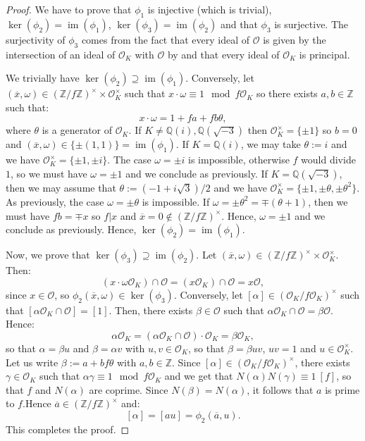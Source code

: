 \documentclass[a4paper,10pt]{report}
\theoremstyle{definition}
\theoremstyle{plain}
\theoremstyle{definition}
\newcommand{\Z}{\mathbb{Z}}
\newcommand{\Q}{\mathbb{Q}}
\newcommand{\mO}{\mathcal{O}}
\DeclareMathOperator{\im}{im}
\renewcommand{\(}{\left(}
\renewcommand{\)}{\right)}
\begin{document}
\begin{proof}
We have to prove that $\phi_1$ is injective (which is trivial), $\ker(\phi_2)=\im(\phi_1)$, $\ker(\phi_3)=\im(\phi_2)$ and that $\phi_3$ is surjective. The surjectivity of $\phi_3$ comes from the fact that every ideal of $\mO$ is given by the intersection of an ideal of $\mO_K$ with $\mO$ by \cite[Proposition 7.20]{Cox} and that every ideal of $\mO_K$ is principal.

We trivially have $\ker(\phi_2)\supseteq \im(\phi_1)$. Conversely, let $(\overline{x},\omega)\in (\Z/f\Z)^\times\times \mO_K^\times$ such that $x\cdot \omega\equiv 1 \mod f\mO_K$ so there exists $a, b\in\Z$ such that:
\[x\cdot\omega=1+fa+fb\theta,\]
where $\theta$ is a generator of $\mO_K$. If $K\neq\Q(i),\Q(\sqrt{-3})$ then $\mO_K^\times=\{\pm 1\}$ so $b=0$ and $(\overline{x},\omega)\in\{\pm(1,1)\}=\im(\phi_1)$. If $K=\Q(i)$, we may take $\theta:=i$ and we have $\mO_K^\times=\{\pm 1, \pm i\}$. The case $\omega=\pm i$ is impossible, otherwise $f$ would divide $1$, so we must have $\omega=\pm 1$ and we conclude as previously. If $K=\Q(\sqrt{-3})$, then we may assume that $\theta:=(-1+i\sqrt{3})/2$ and we have $\mO_K^\times=\{\pm 1, \pm \theta,\pm\theta^2\}$. As previously, the case $\omega=\pm \theta$ is impossible. If $\omega=\pm\theta^2=\mp(\theta+1)$, then we must have $fb=\mp x$ so $f|x$ and $\overline{x}=0\not\in(\Z/f\Z)^\times$. Hence, $\omega=\pm 1$ and we conclude as previously. Hence, $\ker(\phi_2)=\im(\phi_1)$.

Now, we prove that $\ker(\phi_3)\supseteq \im(\phi_2)$. Let $(\overline{x},\omega)\in (\Z/f\Z)^\times\times \mO_K^\times$. Then:
\[(x\cdot\omega\mO_K)\cap\mO=(x\mO_K)\cap\mO=x\mO,\]
since $x\in\mO$, so $\phi_2(\overline{x},\omega)\in \ker(\phi_3)$. Conversely, let $[\alpha]\in(\mO_K/f\mO_K)^\times$ such that $[\alpha\mO_K\cap\mO]=[1]$. Then, there exists $\beta\in\mO$ such that $\alpha\mO_K\cap\mO=\beta\mO$. Hence:
\[\alpha\mO_K=(\alpha\mO_K\cap\mO)\cdot\mO_K=\beta\mO_K,\]
so that $\alpha=\beta u$ and $\beta=\alpha v$ with $u, v\in\mO_K$, so that $\beta=\beta uv$, $uv=1$ and $u\in\mO_K^\times$. Let us write $\beta:=a+bf\theta$ with $a, b\in\Z$. Since $[\alpha]\in(\mO_K/f\mO_K)^\times$, there exists $\gamma\in\mO_K$ such that $\alpha\gamma\equiv 1 \mod f\mO_K$ and we get that $N(\alpha)N(\gamma)\equiv 1 \ [f]$, so that $f$ and $N(\alpha)$ are coprime.  Since $N(\beta)=N(\alpha)$, it follows that $a$ is prime to $f$.Hence $\overline{a}\in(\Z/f\Z)^\times$ and:
\[[\alpha]=[au]=\phi_2(\overline{a},u).\]
This completes the proof.
\end{proof}
\end{document}
